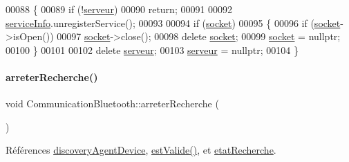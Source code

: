 \begin{DoxyCode}
00088 \{
00089     \textcolor{keywordflow}{if} (!\hyperlink{class_communication_bluetooth_ace7c3b582db4257a20eb873ebfdf368a}{serveur})
00090         \textcolor{keywordflow}{return};
00091 
00092     \hyperlink{class_communication_bluetooth_a5ee2e50a8558ebb27b72a97343dabbf3}{serviceInfo}.unregisterService();
00093 
00094     \textcolor{keywordflow}{if} (\hyperlink{class_communication_bluetooth_aa07c388515488b3d38d37f1518bfd9d2}{socket})
00095     \{
00096         \textcolor{keywordflow}{if} (\hyperlink{class_communication_bluetooth_aa07c388515488b3d38d37f1518bfd9d2}{socket}->isOpen())
00097            \hyperlink{class_communication_bluetooth_aa07c388515488b3d38d37f1518bfd9d2}{socket}->close();
00098         \textcolor{keyword}{delete} \hyperlink{class_communication_bluetooth_aa07c388515488b3d38d37f1518bfd9d2}{socket};
00099         \hyperlink{class_communication_bluetooth_aa07c388515488b3d38d37f1518bfd9d2}{socket} = \textcolor{keyword}{nullptr};
00100     \}
00101 
00102     \textcolor{keyword}{delete} \hyperlink{class_communication_bluetooth_ace7c3b582db4257a20eb873ebfdf368a}{serveur};
00103     \hyperlink{class_communication_bluetooth_ace7c3b582db4257a20eb873ebfdf368a}{serveur} = \textcolor{keyword}{nullptr};
00104 \}
\end{DoxyCode}
\mbox{\label{class_communication_bluetooth_ab9993bd24a2f0c8254564a36cdf16069}} 
\paragraph{\texorpdfstring{arreter\+Recherche()}{arreterRecherche()}}
{\footnotesize\ttfamily void Communication\+Bluetooth\+::arreter\+Recherche (\begin{DoxyParamCaption}{ }\end{DoxyParamCaption})}



Références \hyperlink{class_communication_bluetooth_a9e04dbd88ba090525d6691cc1a4237b6}{discovery\+Agent\+Device}, \hyperlink{class_communication_bluetooth_a69f544bb71f5287689ee051511811669}{est\+Valide()}, et \hyperlink{class_communication_bluetooth_a9e252653d4d3c6fa9c772b35bf0eb02f}{etat\+Recherche}.



